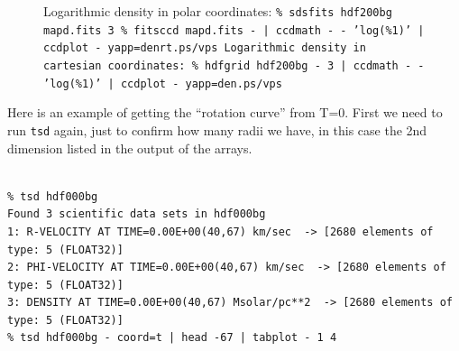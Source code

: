 \documentclass[10pt,dvips]{article}
\begin{document}
\begin{figure}[htbp]
\centering
{}
\hspace{0in}
\caption{
Logarithmic density in polar coordinates:\newline
  \tt \% sdsfits hdf200bg mapd.fits 3\newline
  \tt \% fitsccd mapd.fits - | ccdmath - - 'log(\%1)' | ccdplot - yapp=denrt.ps/vps\newline
Logarithmic density in cartesian coordinates:\newline
  \tt \% hdfgrid hdf200bg - 3 | ccdmath - - 'log(\%1)' | ccdplot - yapp=den.ps/vps\newline
}
\end{figure}

Here is an example of getting the ``rotation curve'' from T=0. First we need to run
{\tt tsd} again, just to confirm how many radii we have, in this case the 2nd
dimension listed in the output of the arrays.

\footnotesize\begin{verbatim}

% tsd hdf000bg
Found 3 scientific data sets in hdf000bg
1: R-VELOCITY AT TIME=0.00E+00(40,67) km/sec  -> [2680 elements of type: 5 (FLOAT32)]
2: PHI-VELOCITY AT TIME=0.00E+00(40,67) km/sec  -> [2680 elements of type: 5 (FLOAT32)]
3: DENSITY AT TIME=0.00E+00(40,67) Msolar/pc**2  -> [2680 elements of type: 5 (FLOAT32)]
% tsd hdf000bg - coord=t | head -67 | tabplot - 1 4

\end{verbatim}\normalsize
\end{document}
